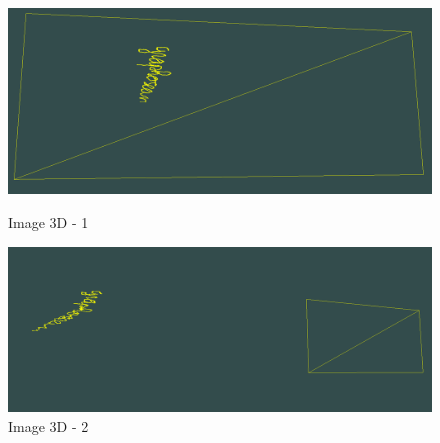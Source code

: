 \begin{figure}
\includegraphics[width=\textwidth]{Modules/Picture/3d_1}
\caption{Image 3D - 1}
\label{3D1}
\vspace{30px}
\includegraphics[width=\textwidth]{Modules/Picture/3d_2}
\caption{Image 3D - 2}
\label{3D2}
\end{figure}

\clearpage